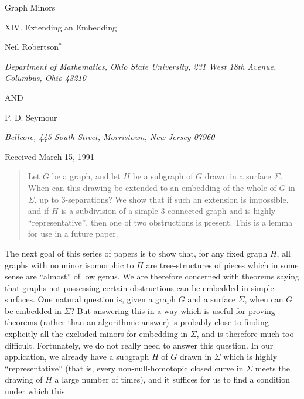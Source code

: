 {\centering
{\Large Graph Minors\par}
{\large XIV. Extending an Embedding\par}\medskip

Neil Robertson$^*$\par
\textit{Department of Mathematics, Ohio State University, 231 West 18th Avenue, Columbus, Ohio 43210}\par
AND\par
P. D. Seymour\par
\textit{Bellcore, 445 South Street, Morristown, New Jersey 07960}\par
Received March 15, 1991\par
}
\begin{quote}
Let $G$ be a graph, and let $H$ be a subgraph of $G$ drawn in a surface $\Sigma$. When can this drawing be extended to an embedding of the whole of $G$ in $\Sigma$, up to 3-separations? We show that if such an extension is impossible, and if $H$ is a subdivision of a simple 3-connected graph and is highly ``representative'', then one of two obstructions is present. This is a lemma for use in a future paper.
\end{quote}


The next goal of this series of papers is to show that, for any fixed graph $H$, all graphs with no minor isomorphic to $H$ are tree-structures of pieces which in some sense are ``almost'' of low genus. We are therefore concerned with theorems saying that graphs not possessing certain obstructions can be embedded in simple surfaces. One natural question is, given a graph $G$ and a surface $\Sigma$, when can $G$ be embedded in $\Sigma$? But answering this in a way which is useful for proving theorems (rather than an algorithmic answer) is probably close to finding explicitly all the excluded minors for embedding in $\Sigma$, and is therefore much too difficult. Fortunately, we do not really need to answer this question. In our application, we already have a subgraph $H$ of $G$ drawn in $\Sigma$ which is highly ``representative'' (that is, every non-null-homotopic closed curve in $\Sigma$ meets the drawing of $H$ a large number of times), and it suffices for us to find a condition under which this%
